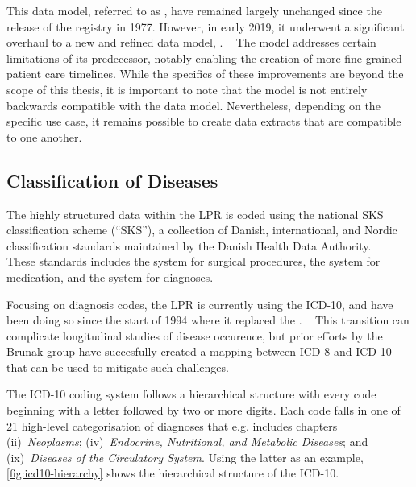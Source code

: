 This data model, referred to as ,  
have remained largely unchanged since the release of the registry in 1977.
However, in early 2019, it underwent a significant overhaul to a 
new and refined data model, .
~\autocite{nielsenLPR32018}
The  model addresses certain limitations of its predecessor, 
notably enabling the creation of more fine-grained patient care timelines. 
While the specifics of these improvements are beyond the scope of this thesis, 
it is important to note that the  model is not entirely 
backwards compatible with the  data model. 
Nevertheless, depending on the specific use case, 
it remains possible to create data extracts that are compatible
to one another.

\subsection{Classification of Diseases}

The highly structured data within the \ac{LPR} 
is coded using the national \acs{SKS} classification scheme (\enquote{\acl{SKS}}), 
a collection of Danish, international, and Nordic classification standards
maintained by the Danish Health Data Authority.
~\autocite{schmidtDanish2015}
These standards includes
the  system for surgical procedures,
the  system for medication,
and the  system for diagnoses. 
~\autocite{schmidtDanish2015}

Focusing on diagnosis codes, 
the \ac{LPR} is currently using the \ac{ICD-10},
and have been doing so since the start of 1994
where it replaced the .
~\autocite{schmidtDanish2015}
This transition can complicate longitudinal studies of disease occurence, 
but prior efforts by the Brunak group have succesfully
created a mapping between \ac{ICD-8} and \ac{ICD-10}
that can be used to mitigate such challenges.
~\autocite{pedersenUnidirectional2023}

The \ac{ICD-10} coding system follows a hierarchical structure 
with every code beginning with a letter followed by two or more digits.
Each code falls in one of 21 high-level categorisation of diagnoses 
that e.g.  includes chapters
(ii)~\emph{Neoplasms};
(iv)~\emph{Endocrine, Nutritional, and Metabolic Diseases};
and (ix)~\emph{Diseases of the Circulatory System}.
Using the latter as an example, 
\cref{fig:icd10-hierarchy} shows the hierarchical structure of the
\ac{ICD-10}.

